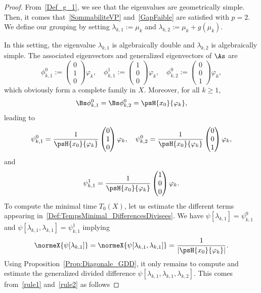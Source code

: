 \begin{proof}
From~\eqref{Def_g_1}, we see that the eigenvalues are geometrically simple. Then, it comes that~\eqref{SommabiliteVP} and~\eqref{GapFaible} are satisfied with $p=2$. We define our grouping by setting $\lambda_{k,1}:=\mu_k$ and $\lambda_{k,2}:=\mu_k+g(\mu_k)$.

In this setting, the eigenvalue $\lambda_{k,1}$ is algebraically double and $\lambda_{k,2}$ is algebraically simple. The associated eigenvectors and generalized eigenvectors of $\As$ are
\[
\phi_{k,1}^0 :=
\begin{pmatrix} 0 \\1\\0
\end{pmatrix} \varphi_k, \quad
\phi_{k,1}^1 :=
\begin{pmatrix} 1\\0\\0
\end{pmatrix} \varphi_k, \quad
\phi_{k,2}^0 :=
\begin{pmatrix} 0\\0\\1
\end{pmatrix} \varphi_k,
\]
which obviously form a complete family in $X$. Moreover, for all $k \geq 1$,
\[
\Bs \phi_{k,1}^0= \Bs \phi_{k,2}^0= \psH{x_0}{\varphi_k},
\]
leading to
\[
\psi_{k,1}^0 = \frac{1}{\psH{x_0}{\varphi_k}}
\begin{pmatrix} 0 \\1\\0
\end{pmatrix} \varphi_k,
\quad
\psi_{k,2}^0 = \frac{1}{\psH{x_0}{\varphi_k}}
\begin{pmatrix} 0\\0\\1
\end{pmatrix} \varphi_k,
\]
and
\[
\psi_{k,1}^1 = \frac{1}{\psH{x_0}{\varphi_k}}
\begin{pmatrix} 1\\0\\0
\end{pmatrix} \varphi_k.
\]
To compute the minimal time $T_0(X)$, let us estimate the different terms appearing in~\eqref{Def:TempsMinimal_DifferencesDivisees}. We have $\psi[\lambda_{k,1}]=\psi_{k,1}^0$ and $\psi[\lambda_{k,1}, \lambda_{k,1}] = \psi_{k,1}^1$ implying
\[
\normeX{\psi[\lambda_{k,1}]} = \normeX{\psi[\lambda_{k,1}, \lambda_{k,1}]} =\frac 1{ | \psH{x_0}{\varphi_k}|}.
\]
Using Proposition~\ref{Prop:Diagonale_GDD}, it only remains to compute and estimate the generalized divided difference $\psi[\lambda_{k,1},\lambda_{k,1},\lambda_{k,2}]$. This comes from~\eqref{rule1} and~\eqref{rule2} as follows

\end{proof}
